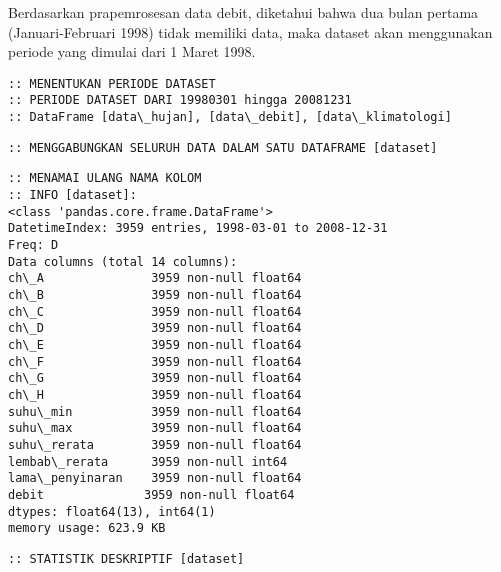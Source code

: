 \documentclass[11pt]{article}
\begin{document}
Berdasarkan prapemrosesan data debit, diketahui bahwa dua bulan pertama
(Januari-Februari 1998) tidak memiliki data, maka dataset akan
menggunakan periode yang dimulai dari 1 Maret 1998.

    \begin{Verbatim}[commandchars=\\\{\}]
:: MENENTUKAN PERIODE DATASET
:: PERIODE DATASET DARI 19980301 hingga 20081231
:: DataFrame [data\_hujan], [data\_debit], [data\_klimatologi]
    \end{Verbatim}

    \begin{Verbatim}[commandchars=\\\{\}]
:: MENGGABUNGKAN SELURUH DATA DALAM SATU DATAFRAME [dataset]
    \end{Verbatim}

    \begin{Verbatim}[commandchars=\\\{\}]
:: MENAMAI ULANG NAMA KOLOM
:: INFO [dataset]:
<class 'pandas.core.frame.DataFrame'>
DatetimeIndex: 3959 entries, 1998-03-01 to 2008-12-31
Freq: D
Data columns (total 14 columns):
ch\_A               3959 non-null float64
ch\_B               3959 non-null float64
ch\_C               3959 non-null float64
ch\_D               3959 non-null float64
ch\_E               3959 non-null float64
ch\_F               3959 non-null float64
ch\_G               3959 non-null float64
ch\_H               3959 non-null float64
suhu\_min           3959 non-null float64
suhu\_max           3959 non-null float64
suhu\_rerata        3959 non-null float64
lembab\_rerata      3959 non-null int64
lama\_penyinaran    3959 non-null float64
debit              3959 non-null float64
dtypes: float64(13), int64(1)
memory usage: 623.9 KB
    \end{Verbatim}

    \begin{Verbatim}[commandchars=\\\{\}]
:: STATISTIK DESKRIPTIF [dataset]
    \end{Verbatim}
\end{document}
